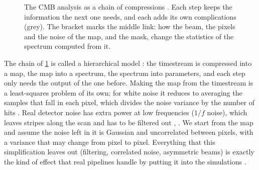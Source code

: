 \begin{figure}[htbp]
\centering
{}
\caption{The CMB analysis as a chain of compressions . Each step
keeps the information the next one needs, and each adds its own complications (grey). The
bracket marks the middle link: how the beam, the pixels and the noise of the map, and the
mask, change the statistics of the spectrum computed from it.}
\label{8a:fig:hierarchy}
\end{figure}

The chain of \cref{8a:fig:hierarchy} is called a hierarchical model
: the timestream is compressed into a map, the map into a
spectrum, the spectrum into parameters, and each step only needs the output of the one
before. Making the map from the timestream is a least-squares problem of its own; for white
noise it reduces to averaging the samples that fall in each pixel, which divides the noise
variance by the number of hits . Real detector noise has
extra power at low frequencies ($1/f$ noise), which leaves stripes along the scan and has to
be filtered out , . We start from the map and
assume the noise left in it is Gaussian and uncorrelated between pixels, with a variance
that may change from pixel to pixel. Everything that this simplification leaves out
(filtering, correlated noise, asymmetric beams) is exactly the kind of effect that real
pipelines handle by putting it into the simulations .
